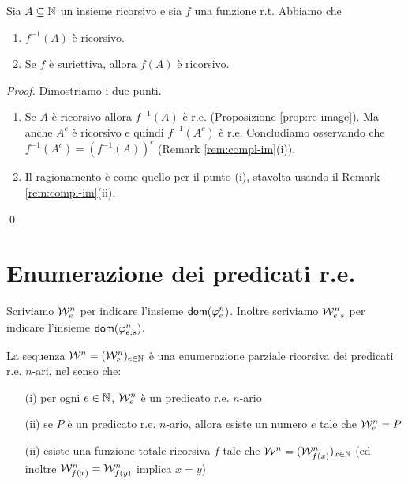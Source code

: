 \documentclass[runningheads,a4paper]{llncs}
\begin{document}
\begin{proposition}
Sia $A \subseteq \mathbb{N}$ un insieme ricorsivo e sia $f$ una funzione r.t. Abbiamo che
\begin{enumerate}[label=(\roman*)]
\item $f^{-1}(A)$ \`{e} ricorsivo.
\item Se $f$ \`{e} suriettiva, allora $f(A)$ \`{e} ricorsivo.
\end{enumerate}
\end{proposition}

\begin{proof}
Dimostriamo i due punti.
\begin{enumerate}[label=(\roman*)]
\item Se $A$ \`{e} ricorsivo allora $f^{-1}(A)$ \`{e} r.e. (Proposizione \ref{prop:re-image}).
 Ma anche $A^c$ \`{e} ricorsivo e quindi $f^{-1}(A^c)$ \`{e} r.e. Concludiamo osservando che $f^{-1}(A^c) = (f^{-1}(A))^c$
 (Remark \ref{rem:compl-im}(i)).
\item Il ragionamento \`{e} come quello per il punto (i), stavolta usando il Remark \ref{rem:compl-im}(ii).
\end{enumerate}
\qed\end{proof}

\section{Enumerazione dei predicati r.e.}

\begin{definition}\label{def:numerazione-r.e.}
Scriviamo $\mathcal{W}_e^n$ per indicare l'insieme $\mathsf{dom}(\varphi_e^n)$. Inoltre scriviamo
 $\mathcal{W}_{e,s}^n$ per indicare l'insieme $\mathsf{dom}(\varphi_{e,s}^n)$.
\end{definition}

\begin{theorem}\label{thm:enumeration-r.e.}
La sequenza $\mathcal{W}^n = (\mathcal{W}_e^n)_{e \in \mathbb{N}}$ \`{e} una enumerazione parziale ricorsiva dei predicati r.e. $n$-ari, nel senso che:
\begin{itemize}
\item[(i)] per ogni $e \in \mathbb{N}$, $\mathcal{W}_e^n$ \`{e} un predicato r.e. $n$-ario
\item[(ii)] se $P$ \`{e} un predicato r.e. $n$-ario, allora esiste un numero $e$ tale che $\mathcal{W}_e^n = P$
\item[(ii)] esiste una funzione totale ricorsiva $f$ tale che $\mathcal{W}^n = (\mathcal{W}_{f(x)}^n)_{x \in \mathbb{N}}$
 (ed inoltre $\mathcal{W}_{f(x)}^n = \mathcal{W}_{f(y)}^n$ implica $x=y$)
\end{itemize}
\end{theorem}
\end{document}
